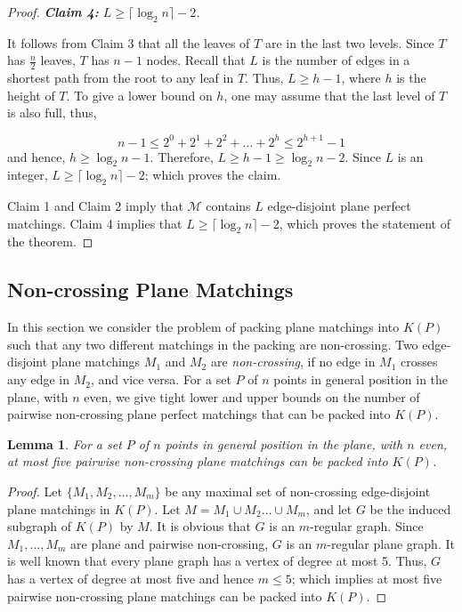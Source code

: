 \documentclass[11pt,a4paper]{article}
\newcommand{\Kn}[1]{K#1}
\newtheorem{lemma}{Lemma}
\begin{document}
\begin{proof}
\vspace{10pt}
{\em {\bf Claim 4:} $L\ge\lceil\log_2{n}\rceil-2$.}

It follows from Claim 3 that all the leaves of $T$ are in the last two levels. Since $T$ has $\frac{n}{2}$ leaves, $T$ has $n-1$ nodes. Recall that $L$ is the number of edges in a shortest path from the root to any leaf in $T$. Thus, $L\ge h-1$, where $h$ is the height of $T$. To give a lower bound on $h$, one may assume that the last level of $T$ is also full, thus,

$$n-1\le 2^0+2^1+2^2+\dots+2^h\le 2^{h+1}-1$$
and hence, $h\ge \log_2{n} -1$. Therefore, $L\ge h-1\ge \log_2{n} -2$.  Since $L$ is an integer, $L\ge\lceil\log_2{n}\rceil-2$; which proves the claim.

\vspace{20pt}

Claim 1 and Claim 2 imply that $\mathcal{M}$ contains $L$ edge-disjoint plane perfect matchings. Claim 4 implies that $L\ge\lceil\log_2{n}\rceil-2$, which proves the statement of the theorem.
\end{proof}


\subsection{Non-crossing Plane Matchings}
\label{non-crossing-matching-section}
In this section we consider the problem of packing plane matchings into $\Kn{(P)}$ such that any two different matchings in the packing are non-crossing.
Two edge-disjoint plane matchings $M_1$ and $M_2$ are {\em non-crossing}, if no edge in $M_1$ crosses any edge in $M_2$, and vice versa. For a set $P$ of $n$ points in general position in the plane, with $n$ even, we give tight lower and upper bounds on the number of pairwise non-crossing plane perfect matchings that can be packed into $\Kn{(P)}$. 

\begin{lemma}
\label{5-non-crossing}
For a set $P$ of $n$ points in general position in the plane, with $n$ even, at most five pairwise non-crossing plane matchings can be packed into $\Kn{(P)}$.
\end{lemma}
\begin{proof}
 Let $\{M_1,M_2,\dots,M_m\}$ be any maximal set of non-crossing edge-disjoint plane matchings in $\Kn{(P)}$. Let $M=M_1\cup M_2\dots \cup M_m$, and let $G$ be the induced subgraph of $\Kn{(P)}$ by $M$. It is obvious that $G$ is an $m$-regular graph. Since $M_1,\dots,M_m$ are plane and pairwise non-crossing, $G$ is an $m$-regular plane graph. It is well known that every plane graph has a vertex of degree at most 5. Thus, $G$ has a vertex of degree at most five and hence $m\le 5$; which implies at most five pairwise non-crossing plane matchings can be packed into $\Kn{(P)}$.
\end{proof}
\end{document}
